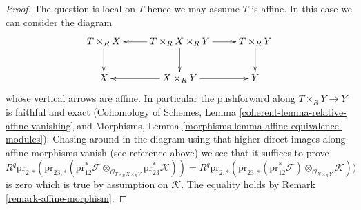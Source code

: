 \documentclass[10pt,a4paper]{amsart}
\theoremstyle{plain}
\theoremstyle{definition}
\theoremstyle{remark}
\numberwithin{equation}{subsection}
\begin{document}
\begin{proof}
The question is local on $T$ hence we may assume $T$ is affine.
In this case we can consider the diagram
$$
\xymatrix{
T \times_R X \ar[d] &
T \times_R X \times_R Y \ar[d] \ar[l] \ar[r] &
T \times_R Y \ar[d] \\
X &
X \times_R Y \ar[l] \ar[r] &
Y
}
$$
whose vertical arrows are affine. In particular the pushforward along
$T \times_R Y \to Y$ is faithful and exact (Cohomology of Schemes,
Lemma \ref{coherent-lemma-relative-affine-vanishing} and
Morphisms, Lemma \ref{morphisms-lemma-affine-equivalence-modules}).
Chasing around in the diagram using that higher direct images along
affine morphisms vanish (see reference above) we see that
it suffices to prove
$$
R^q\text{pr}_{2, *}(
\text{pr}_{23, *}(\text{pr}_{12}^*\mathcal{F}
\otimes_{\mathcal{O}_{T \times_R X \times_R Y}}
\text{pr}_{23}^*\mathcal{K})) =
R^q\text{pr}_{2, *}(
\text{pr}_{23, *}(\text{pr}_{12}^*\mathcal{F})
\otimes_{\mathcal{O}_{X \times_R Y}}
\mathcal{K}))
$$
is zero which is true by assumption on $\mathcal{K}$.
The equality holds by Remark \ref{remark-affine-morphism}.
\end{proof}
\end{document}
